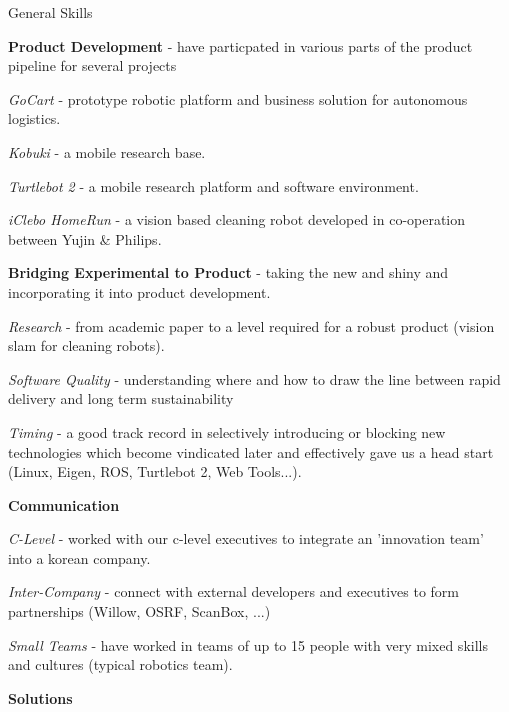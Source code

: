\documentclass[a4paper,10pt]{article}
\begin{document}
\begin{cvsection}{General Skills}
 \raggedright
  \begin{djs_itemize}
    \item \textbf{Product Development} - have particpated in various parts of the product pipeline for several projects
    \begin{djs_itemize}
      \item \textit{GoCart} - prototype robotic platform and business solution for autonomous logistics.
      \item \textit{Kobuki} - a mobile research base.
      \item \textit{Turtlebot 2} - a mobile research platform and software environment.
      \item \textit{iClebo HomeRun} - a vision based cleaning robot developed in co-operation between Yujin \& Philips.
    \end{djs_itemize}
    \item \textbf{Bridging Experimental to Product} - taking the new and shiny and incorporating it into product development.
    \begin{djs_itemize}
      \item \textit{Research} - from academic paper to a level required for a robust product (vision slam for cleaning robots).
      \item \textit{Software Quality} - understanding where and how to draw the line between rapid delivery and long term sustainability
      \item \textit{Timing} - a good track record in selectively introducing or blocking new technologies which become vindicated later and effectively gave us a head start (Linux, Eigen, ROS, Turtlebot 2, Web Tools...).
    \end{djs_itemize}
    \item \textbf{Communication}
    \begin{djs_itemize}
      \item \textit{C-Level} - worked with our c-level executives to integrate an 'innovation team' into a korean company.
      \item \textit{Inter-Company} - connect with external developers and executives to form partnerships (Willow, OSRF, ScanBox, ...)
      \item \textit{Small Teams} - have worked in teams of up to 15 people with very mixed skills and cultures (typical robotics team). 
    \end{djs_itemize}
    \item \textbf{Solutions}

\end{djs_itemize}
\end{cvsection}
\end{document}

